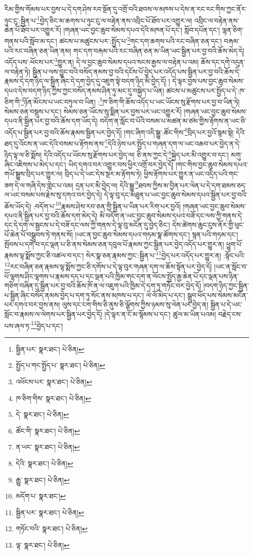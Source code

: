 རིམ་གྱིས་གོམས་པར་བྱས་པ་དེ་དག་ཤེས་རབ་སྔོན་དུ་འགྲོ་བའི་ཐབས་ལ་མཁས་པ་དེས་ན་རང་རང་གིས་ཀྱང་ནོར་ཉུང་ངུ་:སྦྱིན་པ་\footnote{སྦྱིན་པར་  སྣར་ཐང་།  པེ་ཅིན། }བྱེད་ཅིང་མ་ཆགས་པ་ཉུང་ངུ་ལ་བརྟེན་ནས་འབྲིང་པོ་ཐོབ་པར་འགྱུར་ལ། འབྲིང་ལ་བརྟེན་ནས་ཆེན་པོ་ཐོབ་པར་འགྱུར་རོ། །གཞན་ཡང་བྱང་ཆུབ་སེམས་དཔའ་དེའི་མཁན་པོ་དང་། སློབ་དཔོན་དང་། ལྷན་ཅིག་གནས་པའི་སློབ་མ་དང་། ཚངས་པ་མཚུངས་པར་:སྤྱོད་པ་\footnote{སྤྱོད་པ་གང་སྤྱོད་པ་  སྣར་ཐང་།  པེ་ཅིན། }གང་དག་ཆགས་པའི་རང་བཞིན་ཅན་དང་། བརྐམ་པའི་རང་བཞིན་ཅན་ཡིན་ནམ། གང་དག་བརྐམ་པའི་རང་བཞིན་ཅན་མ་ཡིན་ཡང་སྦྱིན་པར་བྱ་བའི་ཆོས་མེད་དེ། འདོད་པས་:ཕོངས་པར་\footnote{འཕོངས་པར་  སྣར་ཐང་།  པེ་ཅིན། }གྱུར་ན། དེ་ལ་བྱང་ཆུབ་སེམས་དཔའ་སངས་རྒྱས་ལ་བརྟེན་པ་འམ། ཆོས་དང་དགེ་འདུན་ལ་བརྟེན་ཏེ། སྦྱིན་པ་ལས་བྱུང་བའི་བསོད་ནམས་བྱ་བའི་དངོས་པོ་བྱེད་པར་འདོད་པས་སྦྱིན་པར་བྱ་བའི་ཆོས་དེ་རྣམས་དེ་དག་ཉིད་ལ་སྦྱིན་ཞིང་དེ་དག་བྱེད་དུ་འཇུག་སྟེ་བདག་ཉིད་མི་བྱེད་དོ། །
དེ་ལྟར་བྱས་པས་བྱང་ཆུབ་སེམས་དཔའ་དེས་བདག་ཉིད་ཀྱིས་ཀྱང་བསོད་ནམས་ཤིན་ཏུ་མང་དུ་བསྐྱེད་པ་ཡིན། ཚངས་པ་མཚུངས་པར་སྤྱོད་པ་དེ་:ཁ་ཅིག་གི་\footnote{ཁ་ཅིག་གིས་  སྣར་ཐང་།  པེ་ཅིན། }ཉོན་མོངས་པ་ཡང་བཏུལ་བ་ཡིན། :\footnote{དེ་  སྣར་ཐང་།  པེ་ཅིན། }ཁ་ཅིག་གི་ཆོས་འདོད་པ་ཡང་ཡོངས་སུ་རྫོགས་པར་བྱ་བ་ཡིན་ཏེ། སེམས་ཅན་བསྡུས་པ་དང་། སེམས་ཅན་ཡོངས་སུ་སྨིན་པར་བྱས་པར་ཡང་འགྱུར་རོ། །གཞན་ཡང་བྱང་ཆུབ་སེམས་དཔའ་ནི་སྦྱིན་པར་བྱ་བའི་ཆོས་དག་ཡོད་དེ། བདོག་ན་སློང་བ་པོའི་བསམ་པ་མཚན་མ་ཙམ་གྱིས་རྟོགས་ན་ཡང་ཅི་འདོད་པ་སྦྱིན་པར་བྱ་བའི་ཆོས་རྣམས་སྦྱིན་པར་བྱེད་དོ། །གང་ཞིག་འདི་སྒྱུ་:ཚོང་གིས་\footnote{ཚོང་གི་  སྣར་ཐང་།  པེ་ཅིན། }བྲིད་པར་བྱའོ་སྙམ་སྟེ། དེའི་ཐད་དུ་འོངས་ན་ཡང་དེའི་བསམ་པ་རྟོགས་ནས་\footnote{ན་ཡང་  སྣར་ཐང་།  པེ་ཅིན། }དེའི་ཉེས་པར་སྤྱོད་པ་གཞན་དག་ལ་ཡང་འཆབ་པར་བྱེད་ན་དེ་ཉིད་ལྟ་ལ་ཅི་སྨོས། དེའི་འདོད་པ་ཡོངས་སུ་རྫོགས་པར་བྱེད་ལ། ཅི་ནས་ཀྱང་དེ་\footnote{དེའི་  སྣར་ཐང་།  པེ་ཅིན། }སྐྱེད་པར་མི་འགྱུར་བ་དང་། མགུ་ཞིང་འཇིགས་པ་མེད་པ་དང་། ཡིད་དགའ་བར་འགྱུར་བས་ཕྱིར་འགྲོ་བར་བྱེད་དོ། །གང་གིས་བྱང་ཆུབ་སེམས་དཔའ་གཡོ་སྒྱུས་བྲིད་པར་གྱུར་ལ། བྲིད་པ་དེ་ཡང་དེས་སྔར་མ་རྟོགས་ཏེ། ཕྱིས་རྟོགས་པར་གྱུར་ན་ཡང་འདྲིད་པའི་གང་ཟག་དེ་ལ་གཞི་དེས་གླེང་པ་འམ། དྲན་པར་མི་བྱེད་ལ། དེའི་སྒྱུ་\footnote{རྒྱུ་  སྣར་ཐང་།  པེ་ཅིན། }ཐབས་ཀྱིས་མ་བྱིན་པར་ལེན་པ་དེ་དག་ཐམས་ཅད་ལ་ཡང་བསམ་པས་རྗེས་སུ་དགའ་བར་བྱེད་དེ། དེ་ལྟ་བུ་དང་མཐུན་པ་ཡང་བྱང་ཆུབ་སེམས་དཔའ་སྦྱིན་པར་བྱ་བའི་ཆོས་ཡོད་དེ། :བདོག་པ་\footnote{མདོག་པ་  སྣར་ཐང་། }རྣམས་ཤེས་རབ་ཅན་གྱི་སྦྱིན་པ་ཡིན་པར་རིག་པར་བྱའོ། །གཞན་ཡང་བྱང་ཆུབ་སེམས་དཔའ་ནི་སྦྱིན་པར་བྱ་བའི་ཆོས་དག་མེད་དེ། མི་བདོག་ན་ཡང་བྱང་ཆུབ་སེམས་དཔའ་བཟོ་དང་ལས་ཀྱི་གནས་དེ་དང་དེ་དག་ལ་སྦྱངས་པ་དེ་བཟོ་དང་ལས་ཀྱི་གནས་དེ་ལྟ་བུ་མངོན་དུ་བྱེད་ཅིང་། དེས་ཚེགས་ཆུང་ངུས་ནོར་གྱི་ཕུང་པོ་ཆེན་པོ་བསྒྲུབས་ཏེ་གནས་སོ། །ཡང་ན་བྱང་ཆུབ་སེམས་དཔའ་གཏམ་སྣ་ཚོགས་དང་། སྙན་པའི་གཏམ་དང་། སྤོབས་པ་དགེ་བ་དང་ལྡན་པ་ཅི་ནས་སེམས་ཅན་དབུལ་པོ་རྣམས་ཀྱང་སྦྱིན་པར་བྱེད་འདོད་པར་གྱུར་ན། ཕྱུག་པོ་རྣམས་ལྟ་སྨོས་ཀྱང་ཅི་འཚལ་བ་དང་། སེར་སྣ་ཅན་རྣམས་ཀྱང་:སྦྱིན་པ་\footnote{སྦྱིན་པར་  སྣར་ཐང་།  པེ་ཅིན། }བྱེད་པར་འདོད་པར་གྱུར་ན། :སྟོང་པའི་\footnote{གཏོང་བའི་  སྣར་ཐང་།  པེ་ཅིན། }རང་བཞིན་ཅན་རྣམས་ལྟ་སྨོས་ཀྱང་ཅི་དགོས་པ་དེ་ལྟ་བུར་གཞན་དག་ལ་ཆོས་སྟོན་པར་བྱེད་དོ། །ཡང་ན་སློང་བ་པོ་ལྷགས་ཤིང་ལྷགས་པ་རྣམས་དད་པ་དང་ལྡན་པའི་ཁྱིམ་གང་དག་ན་ལོངས་སྤྱོད་རྒྱ་ཆེན་པོ་དང་ལྡན་པས་ཉིན་གཅིག་བཞིན་དུ་སྦྱིན་པར་བྱ་བའི་ཆོས་ཁོ་ན་ལ་འཇུག་པའི་ཁྱིམ་དེ་དག་ཏུ་གཏོང་བར་བྱེད་དོ། །བདག་ཉིད་ཀྱང་སྦྱིན་པ་སྦྱིན་ཞིང་བསོད་ནམས་བྱེད་པ་དག་ཏུ་སོང་ནས་མཁས་པ་དང་། ལེ་ལོ་མེད་པ་དང་། སྒྲུབ་ཕོད་པས་སེམས་མངོན་པར་དགའ་བར་བྱས་ནས། ལུས་དང་ངག་གིས་ཅི་ནུས་ཅི་ལྕོགས་ཀྱིས་ཉམས་སུ་ལེན་པར་བྱེད་ན། སྦྱིན་པ་དེ་ཡང་སློང་བ་རྣམས་ལ་ལེགས་པར་སྦྱིན་པར་བྱེད་དོ། །དེ་ལྟར་ན་ངོ་མ་སྙོམས་པ་དང་། ཚུལ་མ་ཡིན་པའམ། བརྗེད་ངས་པས་ཞལ་ཏ་\footnote{ལྟ་  སྣར་ཐང་།  པེ་ཅིན། }བྱེད་པ་དང་། 